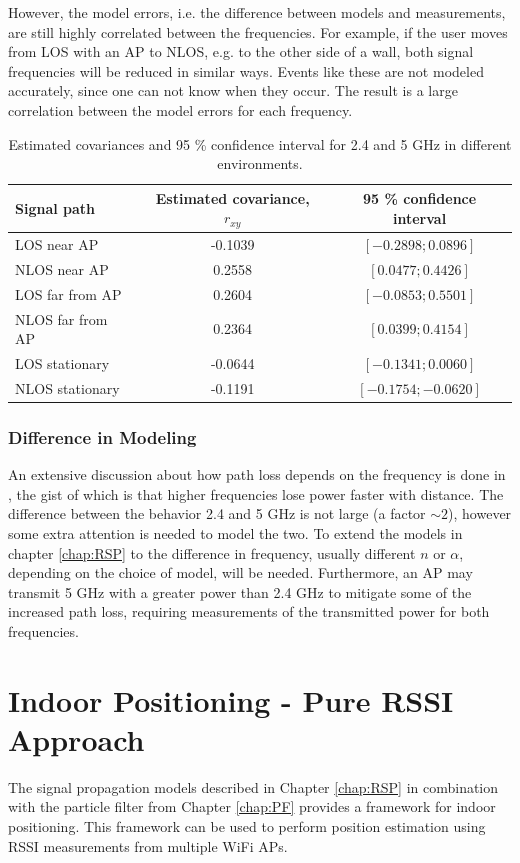 \documentclass{LTHthesis}
\begin{document}
However, the model errors, i.e. the difference between models and measurements, are still highly correlated between the frequencies. For example, if the user moves from LOS with an AP to NLOS, e.g. to the other side of a wall, both signal frequencies will be reduced in similar ways. Events like these are not modeled accurately, since one can not know when they occur. The result is a large correlation between the model errors for each frequency.
%
\begin{table}
\begin{center}
\begin{tabular}{|l|c|c|}
\hline
Signal path & Estimated covariance, $r_{xy}$ & 95 \% confidence interval \\
\hline
\hline
LOS near AP& -0.1039 & $[-0.2898;0.0896]$ \\
\hline
NLOS near AP& 0.2558 & $[0.0477;0.4426]$  \\
\hline
LOS far from AP& 0.2604 & $[-0.0853;0.5501]$\\
\hline
NLOS far from AP& 0.2364& $[0.0399; 0.4154]$ \\
\hline
LOS stationary  &-0.0644 & $[-0.1341;0.0060]$ \\
\hline
NLOS stationary  & -0.1191 &$[-0.1754;-0.0620]$ \\
\hline
\end{tabular}
\end{center}
\caption{Estimated covariances and 95 \% confidence interval for 2.4 and 5 GHz in different environments.}\label{corr_conf}
\end{table}
%
\subsection{Difference in Modeling}
%
An extensive discussion about how path loss depends on the frequency is done in \cite{rappaport96}, the gist of which is that higher frequencies lose power faster with distance. The difference between the behavior  2.4 and 5 GHz is not large (a factor $\sim 2$), however some extra attention is needed to model the two. To extend the models in chapter \ref{chap:RSP} to the difference in frequency, usually different $n$ or $\alpha$, depending on the choice of model, will be needed. Furthermore, an AP may transmit 5 GHz with a greater power than 2.4 GHz to mitigate some of the increased path loss, requiring measurements of the transmitted power for both frequencies.  
%
\chapter{Indoor Positioning - Pure RSSI Approach}
\label{chap:pure_rssi}
%
The signal propagation models described in Chapter \ref{chap:RSP} in combination with the particle filter from Chapter \ref{chap:PF} provides a framework for indoor positioning. This framework can be used to perform position estimation using RSSI measurements from multiple WiFi APs. 
\end{document}
